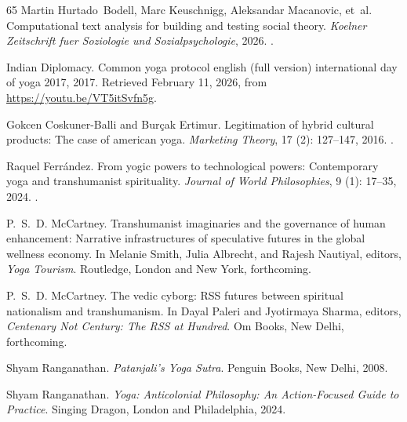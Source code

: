 \documentclass[11pt]{article}
\begin{document}
\begin{thebibliography}{65}
Martin Hurtado~Bodell, Marc Keuschnigg, Aleksandar Macanovic, et~al.
\newblock Computational text analysis for building and testing social theory.
\newblock \emph{Koelner Zeitschrift fuer Soziologie und Sozialpsychologie},
  2026.
\newblock {}.

{Indian Diplomacy}.
\newblock Common yoga protocol english (full version) international day of yoga
  2017, 2017.
\newblock Retrieved February 11, 2026, from \url{https://youtu.be/VT5itSvfn5g}.

Gokcen Coskuner-Balli and Bur{\c{c}}ak Ertimur.
\newblock Legitimation of hybrid cultural products: The case of american yoga.
\newblock \emph{Marketing Theory}, 17 (2): 127--147, 2016.
\newblock {}.

Raquel Ferr{\'a}ndez.
\newblock From yogic powers to technological powers: Contemporary yoga and
  transhumanist spirituality.
\newblock \emph{Journal of World Philosophies}, 9 (1):
  17--35, 2024.
\newblock {}.

P.~S.~D. McCartney.
\newblock Transhumanist imaginaries and the governance of human enhancement:
  Narrative infrastructures of speculative futures in the global wellness
  economy.
\newblock In Melanie Smith, Julia Albrecht, and Rajesh Nautiyal, editors,
  \emph{Yoga Tourism}. Routledge, London and New York,
  forthcoming{}.

P.~S.~D. McCartney.
\newblock The vedic cyborg: {RSS} futures between spiritual nationalism and
  transhumanism.
\newblock In Dayal Paleri and Jyotirmaya Sharma, editors, \emph{Centenary Not
  Century: The {RSS} at Hundred}. Om Books, New Delhi,
  forthcoming{}.

Shyam Ranganathan.
\newblock \emph{Patanjali's Yoga Sutra}.
\newblock Penguin Books, New Delhi, 2008.

Shyam Ranganathan.
\newblock \emph{Yoga: Anticolonial Philosophy: An Action-Focused Guide to
  Practice}.
\newblock Singing Dragon, London and Philadelphia, 2024.


\end{thebibliography}
\end{document}
